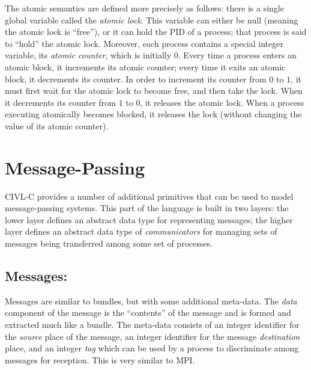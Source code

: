 The atomic semantics are defined more precisely as follows: there is a
single global variable called the \emph{atomic lock}. This variable
can either be null (meaning the atomic lock is ``free''), or it can
hold the PID of a process; that process is said to ``hold'' the atomic
lock.  Moreover, each process contains a special integer variable, its
\emph{atomic counter}, which is initially 0.  Every time a process
enters an atomic block, it increments its atomic counter; every time
it exits an atomic block, it decrements its counter.  In order to
increment its counter from $0$ to $1$, it must first wait for the
atomic lock to become free, and then take the lock.  When it
decrements its counter from $1$ to $0$, it releases the atomic lock.
When a process executing atomically becomes blocked, it releases the
lock (without changing the value of its atomic counter).


\section{Message-Passing}

CIVL-C provides a number of additional primitives that can be used to
model message-passing systems.  This part of the language is built in
two layers: the lower layer defines an abstract data type for
representing messages; the higher layer defines an abstract data type
of \emph{communicators} for managing sets of messages being
transferred among some set of processes.

\subsection{Messages: \cmessage}

Messages are similar to bundles, but with some additional meta-data.
The \emph{data} component of the message is the ``contents'' of the
message and is formed and extracted much like a bundle.  The meta-data
consists of an integer identifier for the \emph{source} place of the
message, an integer identifier for the message \emph{destination}
place, and an integer \emph{tag} which can be used by a process to
discriminate among messages for reception.  This is very similar to
MPI.

